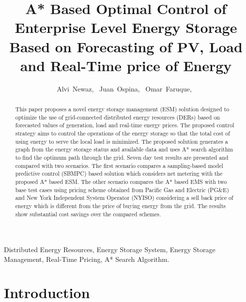 \documentclass[journal]{IEEEtran}
\begin{document}
\title{A* Based Optimal Control of Enterprise Level Energy Storage Based on Forecasting of PV, Load and Real-Time price of Energy}

\author{ Alvi~Newaz,~
Juan~Ospina,~
     Omar~Faruque,~
        }%





\maketitle                                                               

\begin{abstract}
This paper proposes a novel energy storage management (ESM) solution designed to optimize the use of grid-connected distributed energy resources (DERs) based on forecasted values of generation, load and real-time energy prices. The proposed control strategy aims to control the operations of the energy storage so that the total cost of using energy to serve the local load is minimized.
The proposed solution generates a graph from the energy storage status and available data and uses A* search algorithm to find the optimum path through the grid. Seven day test results are presented and compared with two scenarios. The first scenario compares a sampling-based model predictive control (SBMPC) based solution which considers net metering with the proposed A* based ESM. The other scenario compares the A* based EMS with two base test cases using pricing scheme obtained from Pacific Gas and Electric (PG\&E) and New York Independent System Operator (NYISO) considering a sell back price of energy which is different from the price of buying energy from the grid. The results show substantial cost savings over the compared schemes.


\end{abstract}


\begin{IEEEkeywords}
Distributed Energy Resources, Energy Storage System, Energy Storage Management, Real-Time Pricing, A* Search Algorithm.
\end{IEEEkeywords}


\IEEEpeerreviewmaketitle



\section{Introduction}

\end{document}

